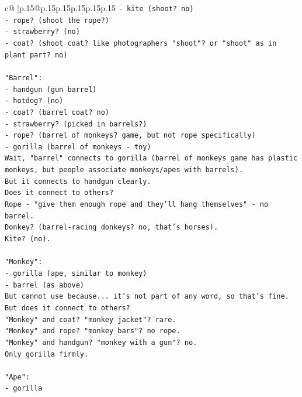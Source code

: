 \documentclass{article}
\begin{document}
{\begin{supertabular}{c@{$\;$}|p{.15\linewidth}@{}p{.15\linewidth}p{.15\linewidth}p{.15\linewidth}p{.15\linewidth}p{.15\linewidth}}
{{{\texttt{{-} kite (shoot? no)} \\
\texttt{{-} rope? (shoot the rope?)} \\
\texttt{{-} strawberry? (no)} \\
\texttt{{-} coat? (shoot coat? like photographers "shoot"? or "shoot" as in plant part? no)} \\
\\ 
\texttt{"Barrel":} \\
\texttt{{-} handgun (gun barrel)} \\
\texttt{{-} hotdog? (no)} \\
\texttt{{-} coat? (barrel coat? no)} \\
\texttt{{-} strawberry? (picked in barrels?)} \\
\texttt{{-} rope? (barrel of monkeys? game, but not rope specifically)} \\
\texttt{{-} gorilla (barrel of monkeys {-} toy)} \\
\texttt{Wait, "barrel" connects to gorilla (barrel of monkeys game has plastic monkeys, but people associate monkeys/apes with barrels).} \\
\texttt{But it connects to handgun clearly.} \\
\texttt{Does it connect to others?} \\
\texttt{Rope {-} "give them enough rope and they'll hang themselves" {-} no barrel.} \\
\texttt{Donkey? (barrel{-}racing donkeys? no, that's horses).} \\
\texttt{Kite? (no).} \\
\\ 
\texttt{"Monkey":} \\
\texttt{{-} gorilla (ape, similar to monkey)} \\
\texttt{{-} barrel (as above)} \\
\texttt{But cannot use because... it's not part of any word, so that's fine.} \\
\texttt{But does it connect to others?} \\
\texttt{"Monkey" and coat? "monkey jacket"? rare.} \\
\texttt{"Monkey" and rope? "monkey bars"? no rope.} \\
\texttt{"Monkey" and handgun? "monkey with a gun"? no.} \\
\texttt{Only gorilla firmly.} \\
\\ 
\texttt{"Ape":} \\
\texttt{{-} gorilla} \\
}}}
\end{supertabular}}
\end{document}
